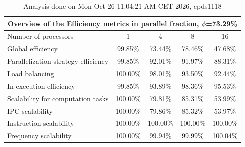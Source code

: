 \begin{table}[h]
\begin{center}
\begin{tabular}{|l|c|c|c|c|}
\hline
\multicolumn{5}{|c|}{Overview of the Efficiency metrics in parallel fraction, $\phi$=73.29\%} \\
\hline
\hline
Number of processors & 1 & 4 & 8 & 16 \\
\hline
\hline
Global efficiency                      &     99.85\% &     73.44\% &     78.46\% &     47.68\% \\
\hline
\hline
Parallelization strategy efficiency &     99.85\% &     92.01\% &     91.97\% &     88.31\% \\
\hline
Load balancing                   &    100.00\% &     98.01\% &     93.50\% &     92.44\% \\
In execution efficiency          &     99.85\% &     93.89\% &     98.36\% &     95.53\% \\
\hline
\hline
Scalability for computation tasks   &    100.00\% &     79.81\% &     85.31\% &     53.99\% \\
\hline
IPC scalability                  &    100.00\% &     79.86\% &     85.32\% &     53.97\% \\
Instruction scalability          &    100.00\% &    100.00\% &    100.00\% &    100.00\% \\
Frequency scalability            &    100.00\% &     99.94\% &     99.99\% &    100.04\% \\
\hline
\end{tabular}
\end{center}
\caption{ Analysis done on Mon Oct 26 11:04:21 AM CET 2026, cpds1118}
\end{table}
